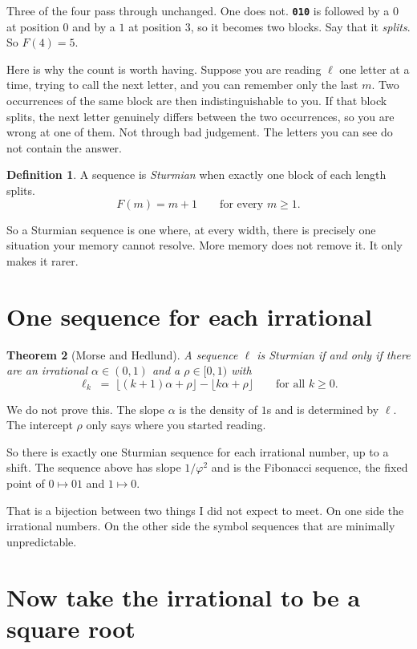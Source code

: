 \documentclass[11pt,a4paper]{article}
\newcommand{\blk}[2]{\texttt{\textbf{\textcolor{#1}{#2}}}}
\theoremstyle{definition}
\newtheorem{definition}{Definition}
\theoremstyle{plain}
\newtheorem{theorem}[definition]{Theorem}
\begin{document}
Three of the four pass through unchanged. One does not. \blk{cA}{010} is
followed by a $0$ at position $0$ and by a $1$ at position $3$, so it becomes
two blocks. Say that it \emph{splits}. So $F(4) = 5$.

Here is why the count is worth having. Suppose you are reading $\ell$ one letter
at a time, trying to call the next letter, and you can remember only the last
$m$. Two occurrences of the same block are then indistinguishable to you. If
that block splits, the next letter genuinely differs between the two
occurrences, so you are wrong at one of them. Not through bad judgement. The
letters you can see do not contain the answer.

\begin{definition}
A sequence is \emph{Sturmian} when exactly one block of each length splits.
\[
  F(m) = m + 1 \qquad \text{for every } m \geq 1 .
\]
\end{definition}

So a Sturmian sequence is one where, at every width, there is precisely one
situation your memory cannot resolve. More memory does not remove it. It only
makes it rarer.

\section{One sequence for each irrational}

\begin{theorem}[Morse and Hedlund]
A sequence $\ell$ is Sturmian if and only if there are an irrational
$\alpha \in (0,1)$ and a $\rho \in [0,1)$ with
\[
  \ell_k \;=\; \lfloor (k+1)\alpha + \rho \rfloor - \lfloor k\alpha + \rho \rfloor
  \qquad \text{for all } k \geq 0 .
\]
\end{theorem}

We do not prove this. The slope $\alpha$ is the density of $1$s and is
determined by $\ell$. The intercept $\rho$ only says where you started reading.

So there is exactly one Sturmian sequence for each irrational number, up to a
shift. The sequence above has slope $1/\varphi^2$ and is the Fibonacci sequence,
the fixed point of $0 \mapsto 01$ and $1 \mapsto 0$.

That is a bijection between two things I did not expect to meet. On one side the
irrational numbers. On the other side the symbol sequences that are minimally
unpredictable.

\section{Now take the irrational to be a square root}
\end{document}
